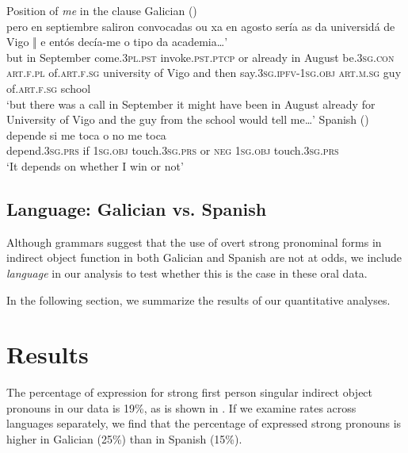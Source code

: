 \documentclass[output=paper]{langscibook}
\begin{document}
\ea%
    Position of \textit{me} in the clause\label{ex:brown:9}
    \ea  Galician () \label{ex:brown:9a}\\
    \gll pero en septiembre saliron convocadas {\textbar} ou xa en agosto sería {\textbar} as da universidá de Vigo ‖ e entós decía-me o tipo da academia…’\\
     but in September come.\textsc{3pl.pst} invoke.\textsc{pst.ptcp} {} or already in August be.\textsc{3sg.con} {} \textsc{art.f.pl} of.\textsc{art.f.sg} university of Vigo {} and then say.\textsc{3sg.ipfv-1sg.obj} \textsc{art.m.sg} guy of.\textsc{art.f.sg} school\\
    \glt ‘but there was a call in September {\textbar} it might have been in August already {\textbar} for University of Vigo {\textbar}{\textbar} and the guy from the school would tell me…’
    \ex  Spanish () \label{ex:brown:9b}\\
    \gll depende si me toca o no me toca\\
         depend.\textsc{3sg.prs} if \textsc{1sg.obj} touch.\textsc{3sg.prs} or \textsc{neg} \textsc{1sg.obj} touch.\textsc{3sg.prs}\\
    \glt ‘It depends on whether I win or not’
    \z
\z

\subsection{Language: Galician vs. Spanish}
Although grammars suggest that the use of overt strong pronominal forms in indirect object function in both Galician and Spanish are not at odds, we include \textit{language} in our analysis to test whether this is the case in these oral data. 

In the following section, we summarize the results of our quantitative analyses.  

\section{Results}

The percentage of expression for strong first person singular indirect object pronouns in our data is 19\%, as is shown in . If we examine rates across languages separately, we find that the percentage of expressed strong pronouns is higher in Galician (25\%) than in Spanish (15\%). 
\end{document}
